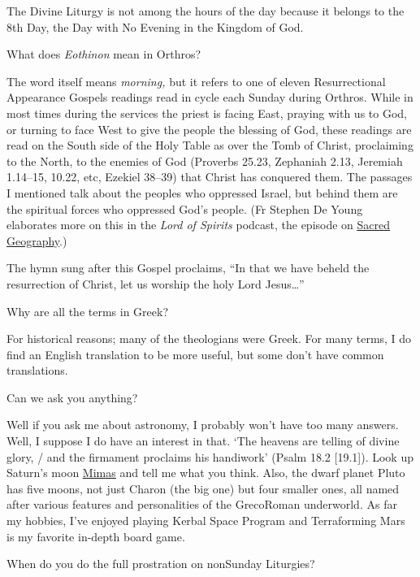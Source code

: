 \documentclass[
]{article}
\begin{document}
The Divine Liturgy is not among the hours of the day because it belongs
to the 8th Day, the Day with No Evening in the Kingdom of God.

What does \emph{Eothinon} mean in Orthros?

The word itself means \emph{morning,} but it refers to one of eleven
Resurrectional Appearance Gospels readings read in cycle each Sunday
during Orthros. While in most times during the services the priest is
facing East, praying with us to God, or turning to face West to give the
people the blessing of God, these readings are read on the South side of
the Holy Table as over the Tomb of Christ, proclaiming to the North, to
the enemies of God (Proverbs 25.23, Zephaniah 2.13, Jeremiah 1.14--15,
10.22, etc, Ezekiel 38--39) that Christ has conquered them. The passages
I mentioned talk about the peoples who oppressed Israel, but behind them
are the spiritual forces who oppressed God's people. (Fr Stephen De
Young elaborates more on this in the \emph{Lord of Spirits} podcast, the
episode on
\href{https://www.ancientfaith.com/podcasts/lordofspirits/the_mountain_of_god_and_the_boat_of_theseus}{\ul{Sacred
Geography}}.)

The hymn sung after this Gospel proclaims, ``In that we have beheld the
resurrection of Christ, let us worship the holy Lord Jesus\ldots{}''

Why are all the terms in Greek?

For historical reasons; many of the theologians were Greek. For many
terms, I do find an English translation to be more useful, but some
don't have common translations.

Can we ask you anything?

Well if you ask me about astronomy, I probably won't have too many
answers. Well, I suppose I do have an interest in that. `The heavens are
telling of divine glory, / and the firmament proclaims his handiwork'
(Psalm 18.2 {[}19.1{]}). Look up Saturn's moon
\href{https://upload.wikimedia.org/wikipedia/commons/b/bc/Mimas_Cassini.jpg}{\ul{Mimas}}
and tell me what you think. Also, the dwarf planet Pluto has five moons,
not just Charon (the big one) but four smaller ones, all named after
various features and personalities of the GrecoRoman underworld. As far
my hobbies, I've enjoyed playing Kerbal Space Program and Terraforming
Mars is my favorite in-depth board game.

When do you do the full prostration on nonSunday Liturgies?
\end{document}

